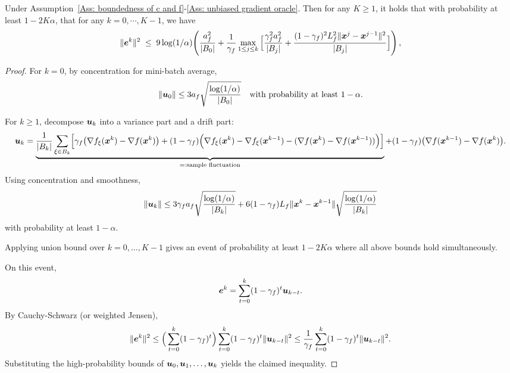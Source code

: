 \documentclass[10pt]{article}
\begin{document}
\begin{lemma}
    Under Assumption~\ref{Ass: boundedness of c and f}-\ref{Ass: unbiased gradient oracle}. 
    Then for any \( K \geq 1\), it holds that with probability at least $1-2K \alpha$, that for any
    $k = 0, \cdots, K-1$, we have 
    \begin{align*}
    \|\bm{e}^k\|^2
\;\le\;
9\log(1/\alpha)\!\left(
\frac{a_f^2}{|B_0|}
+\frac{1}{\gamma_f}\max_{1\le j\le k}
\Big[
\frac{\gamma_f^2 a_f^2}{|B_j|}
+\frac{(1-\gamma_f)^2L_f^2\|\bm{x}^j-\bm{x}^{j-1}\|^2}{|B_j|}
\Big]
\right),
    \end{align*}
\end{lemma}
\begin{proof}
For $k=0$, by concentration for mini-batch average,
\[
\|\bm{u}_0\|
\le 3a_f\sqrt{\frac{\log(1/\alpha)}{|B_0|}}
\quad\text{with probability at least }1-\alpha.
\]

For $k\ge 1$, decompose $\bm{u}_k$ into a variance part and a drift part:
\[
\bm{u}_k
=
\underbrace{
\frac{1}{|B_k|}\sum_{\xi\in B_k}
\!\left[
\gamma_f\big(\nabla f_\xi(\bm{x}^k)-\nabla f(\bm{x}^k)\big)
+(1-\gamma_f)\Big(
\nabla f_\xi(\bm{x}^k)-\nabla f_\xi(\bm{x}^{k-1})
-(\nabla f(\bm{x}^k)-\nabla f(\bm{x}^{k-1}))
\Big)
\right]}_{=: \text{sample fluctuation}}
+
(1-\gamma_f)\big(\nabla f(\bm{x}^{k-1})-\nabla f(\bm{x}^k)\big).
\]
Using concentration and smoothness,
\[
\|\bm{u}_k\|
\le
3\gamma_f a_f\sqrt{\frac{\log(1/\alpha)}{|B_k|}}
+
6(1-\gamma_f)L_f\|\bm{x}^k-\bm{x}^{k-1}\|
\sqrt{\frac{\log(1/\alpha)}{|B_k|}}
\]
with probability at least $1-\alpha$.

Applying union bound over $k=0,\ldots,K-1$ gives an event of probability
at least $1-2K\alpha$ where all above bounds hold simultaneously.

On this event,
\[
\bm{e}^k=\sum_{t=0}^k(1-\gamma_f)^t\bm{u}_{k-t}.
\]
By Cauchy-Schwarz (or weighted Jensen),
\[
\|\bm{e}^k\|^2
\le
\Big(\sum_{t=0}^k(1-\gamma_f)^t\Big)
\sum_{t=0}^k(1-\gamma_f)^t\|\bm{u}_{k-t}\|^2
\le
\frac{1}{\gamma_f}\sum_{t=0}^k(1-\gamma_f)^t\|\bm{u}_{k-t}\|^2.
\]
Substituting the high-probability bounds of $\bm{u}_0,\bm{u}_1,\ldots,\bm{u}_k$
yields the claimed inequality.
\end{proof}
\end{document}
